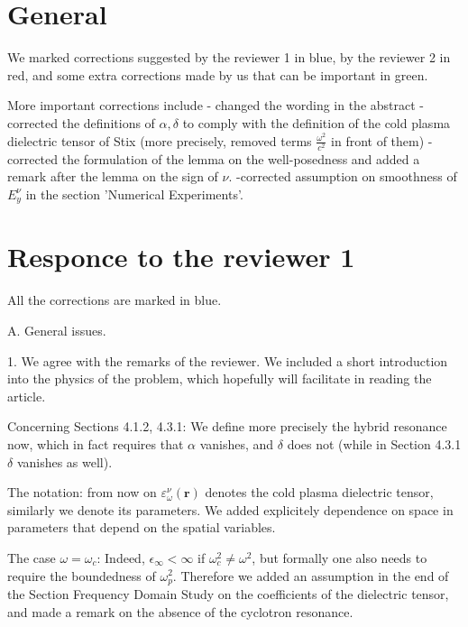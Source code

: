 \documentclass[a4paper,10pt]{article}
\title{}
\author{}
\begin{document}
\maketitle

\begin{abstract}

\end{abstract}

\section{General}

We marked corrections suggested by the reviewer 1 in blue, by the reviewer 2 in red, 
and some extra corrections made by us that can be important in green.

More important corrections include
- changed the wording in the abstract
- corrected the definitions of $\alpha,\delta$ to comply with the definition of the cold plasma dielectric tensor of Stix 
(more precisely, removed terms $\frac{\omega^2}{c^2}$ in 
front of them)
- corrected the formulation of the lemma on the well-posedness and added a remark after the lemma on the sign of $\nu$.
-corrected assumption on smoothness of $E_y^{\nu}$ in the section 'Numerical Experiments'.



\section{Responce to the reviewer 1}

All the corrections are marked in blue. 

A. General issues.

1. We agree with the remarks of the reviewer. We included a short introduction into the physics of the problem, 
which hopefully will facilitate in reading the article. 

Concerning Sections 4.1.2, 4.3.1: 
We define more precisely the hybrid resonance now, which in fact requires that $\alpha$ vanishes, 
and $\delta$ does not (while in Section 4.3.1 $\delta$ vanishes as well).


The notation: 
from now on $\varepsilon^{\nu}_{\omega}(\mathbf{r})$ denotes the cold plasma dielectric tensor, similarly we denote its parameters. 
We added explicitely dependence on space in parameters that depend on the spatial variables. 

The case $\omega=\omega_c$:
Indeed, $\epsilon_{\infty}<\infty$ if $\omega_c^2\neq \omega^2$, but formally one also needs to require the boundedness of $\omega_p^2$. Therefore we 
added an assumption in the end of the Section Frequency Domain Study on the coefficients of the dielectric tensor, and made a remark on the absence
of the cyclotron resonance. 
\end{document}
